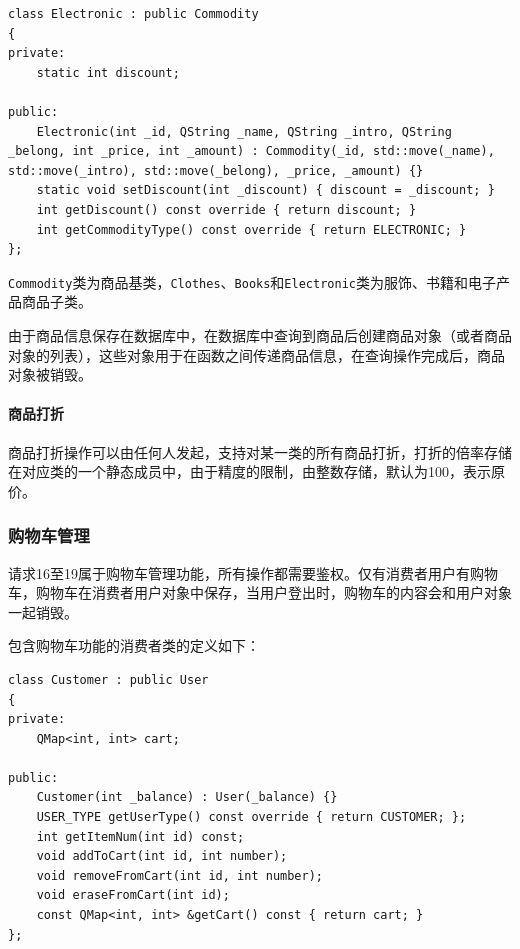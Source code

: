 \documentclass[lang=cn,11pt,a4paper,cite=authornum]{paper}
\begin{document}
\begin{code}
\begin{verbatim}
class Electronic : public Commodity
{
private:
    static int discount;
 
public:
    Electronic(int _id, QString _name, QString _intro, QString _belong, int _price, int _amount) : Commodity(_id, std::move(_name), std::move(_intro), std::move(_belong), _price, _amount) {}
    static void setDiscount(int _discount) { discount = _discount; }
    int getDiscount() const override { return discount; }
    int getCommodityType() const override { return ELECTRONIC; }
};
\end{verbatim}
\end{code}

\texttt{Commodity}类为商品基类，\texttt{Clothes}、\texttt{Books}和\texttt{Electronic}类为服饰、书籍和电子产品商品子类。

由于商品信息保存在数据库中，在数据库中查询到商品后创建商品对象（或者商品对象的列表），这些对象用于在函数之间传递商品信息，在查询操作完成后，商品对象被销毁。

\paragraph{商品打折}

商品打折操作可以由任何人发起，支持对某一类的所有商品打折，打折的倍率存储在对应类的一个静态成员中，由于精度的限制，由整数存储，默认为100，表示原价。

\subsubsection{购物车管理}

请求16至19属于购物车管理功能，所有操作都需要鉴权。仅有消费者用户有购物车，购物车在消费者用户对象中保存，当用户登出时，购物车的内容会和用户对象一起销毁。

包含购物车功能的消费者类的定义如下：

\begin{code}
\begin{verbatim}
class Customer : public User
{
private:
    QMap<int, int> cart; 
 
public:
    Customer(int _balance) : User(_balance) {}
    USER_TYPE getUserType() const override { return CUSTOMER; };
    int getItemNum(int id) const;
    void addToCart(int id, int number);
    void removeFromCart(int id, int number);
    void eraseFromCart(int id);
    const QMap<int, int> &getCart() const { return cart; }
};
\end{verbatim}
\end{code}
\end{document}
